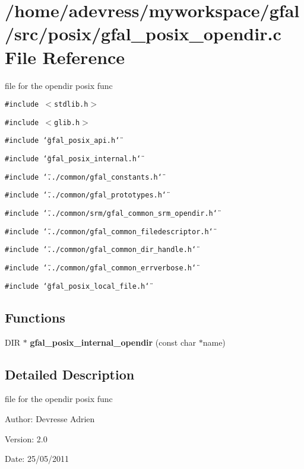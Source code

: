 \section{/home/adevress/myworkspace/gfal/src/posix/gfal\_\-posix\_\-opendir.c File Reference}
\label{gfal__posix__opendir_8c}
file for the opendir posix func 

{\tt \#include $<$stdlib.h$>$}\par
{\tt \#include $<$glib.h$>$}\par
{\tt \#include \char`\"{}gfal\_\-posix\_\-api.h\char`\"{}}\par
{\tt \#include \char`\"{}gfal\_\-posix\_\-internal.h\char`\"{}}\par
{\tt \#include \char`\"{}../common/gfal\_\-constants.h\char`\"{}}\par
{\tt \#include \char`\"{}../common/gfal\_\-prototypes.h\char`\"{}}\par
{\tt \#include \char`\"{}../common/srm/gfal\_\-common\_\-srm\_\-opendir.h\char`\"{}}\par
{\tt \#include \char`\"{}../common/gfal\_\-common\_\-filedescriptor.h\char`\"{}}\par
{\tt \#include \char`\"{}../common/gfal\_\-common\_\-dir\_\-handle.h\char`\"{}}\par
{\tt \#include \char`\"{}../common/gfal\_\-common\_\-errverbose.h\char`\"{}}\par
{\tt \#include \char`\"{}gfal\_\-posix\_\-local\_\-file.h\char`\"{}}\par
\subsection*{Functions}
\begin{CompactItemize}
\item 
DIR $\ast$ \textbf{gfal\_\-posix\_\-internal\_\-opendir} (const char $\ast$name)\label{gfal__posix__opendir_8c_b2e2608cd7c4ff0cecf68e04923d93cc}

\end{CompactItemize}


\subsection{Detailed Description}
file for the opendir posix func 

\begin{Desc}
\item[Author:]Devresse Adrien \end{Desc}
\begin{Desc}
\item[Version:]2.0 \end{Desc}
\begin{Desc}
\item[Date:]25/05/2011 \end{Desc}
